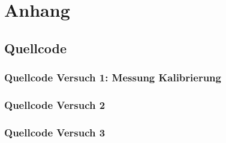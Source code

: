 \documentclass[12pt, oneside, a4paper, \docLanguage]{report}
\begin{document}
%
%
\renewcommand\thesection{A.\arabic{section}}
\renewcommand\thesubsection{\thesection.\arabic{subsection}}

\chapter*{Anhang}
\label{chap:APPENDIX}
\addtocounter{chapter}{1}
\setcounter{section}{0}

\section{Quellcode}
\label{chap:APPENDIX_SOURCECODE}

\subsection{Quellcode Versuch 1: Messung Kalibrierung}
\label{chap:APPENDIX_SOURCECODE_V1}

\newpage
\subsection{Quellcode Versuch 2}
\label{chap:APPENDIX_SOURCECODE_V2}

\newpage
\subsection{Quellcode Versuch 3}
\label{chap:APPENDIX_SOURCECODE_V3}

\newpage
\end{document}
